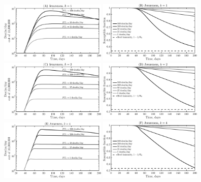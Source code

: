\begin{figure}[t!]
\begin{center}
\includegraphics[width=0.45\textwidth]{figseir_Speak_k1_noname.pdf}
\includegraphics[width=0.435\textwidth]{figseir_Susc_k1_noname.pdf}\\
\includegraphics[width=0.45\textwidth]{figseir_Speak_k2_noname.pdf}
\includegraphics[width=0.435\textwidth]{figseir_Susc_k2_noname.pdf}\\
\includegraphics[width=0.45\textwidth]{figseir_Speak_k4_noname.pdf}
\includegraphics[width=0.435\textwidth]{figseir_Susc_k4_noname.pdf}\\

\end{center}
\end{figure}
